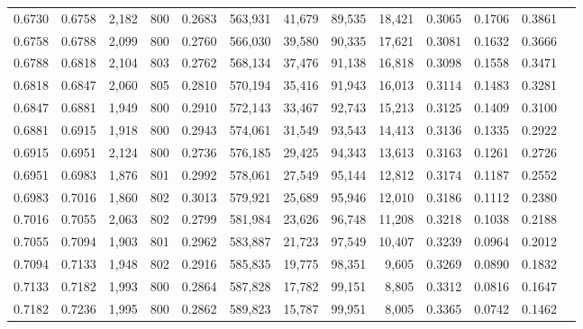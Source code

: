 \begin{tabular}{rrrrrrrrrrrrr}
0.6730 & 0.6758 &  2,182 & 800 &                                     0.2683 & 563,931 &  41,679 &  89,535 &  18,421 & 0.3065 & 0.1706 & 0.3861 \\
0.6758 & 0.6788 &  2,099 & 800 &                                     0.2760 & 566,030 &  39,580 &  90,335 &  17,621 & 0.3081 & 0.1632 & 0.3666 \\
0.6788 & 0.6818 &  2,104 & 803 &                                     0.2762 & 568,134 &  37,476 &  91,138 &  16,818 & 0.3098 & 0.1558 & 0.3471 \\
0.6818 & 0.6847 &  2,060 & 805 &                                     0.2810 & 570,194 &  35,416 &  91,943 &  16,013 & 0.3114 & 0.1483 & 0.3281 \\
0.6847 & 0.6881 &  1,949 & 800 &                                     0.2910 & 572,143 &  33,467 &  92,743 &  15,213 & 0.3125 & 0.1409 & 0.3100 \\
0.6881 & 0.6915 &  1,918 & 800 &                                     0.2943 & 574,061 &  31,549 &  93,543 &  14,413 & 0.3136 & 0.1335 & 0.2922 \\
0.6915 & 0.6951 &  2,124 & 800 &                                     0.2736 & 576,185 &  29,425 &  94,343 &  13,613 & 0.3163 & 0.1261 & 0.2726 \\
0.6951 & 0.6983 &  1,876 & 801 &                                     0.2992 & 578,061 &  27,549 &  95,144 &  12,812 & 0.3174 & 0.1187 & 0.2552 \\
0.6983 & 0.7016 &  1,860 & 802 &                                     0.3013 & 579,921 &  25,689 &  95,946 &  12,010 & 0.3186 & 0.1112 & 0.2380 \\
0.7016 & 0.7055 &  2,063 & 802 &                                     0.2799 & 581,984 &  23,626 &  96,748 &  11,208 & 0.3218 & 0.1038 & 0.2188 \\
0.7055 & 0.7094 &  1,903 & 801 &                                     0.2962 & 583,887 &  21,723 &  97,549 &  10,407 & 0.3239 & 0.0964 & 0.2012 \\
0.7094 & 0.7133 &  1,948 & 802 &                                     0.2916 & 585,835 &  19,775 &  98,351 &   9,605 & 0.3269 & 0.0890 & 0.1832 \\
0.7133 & 0.7182 &  1,993 & 800 &                                     0.2864 & 587,828 &  17,782 &  99,151 &   8,805 & 0.3312 & 0.0816 & 0.1647 \\
0.7182 & 0.7236 &  1,995 & 800 &                                     0.2862 & 589,823 &  15,787 &  99,951 &   8,005 & 0.3365 & 0.0742 & 0.1462 \\

\end{tabular}
